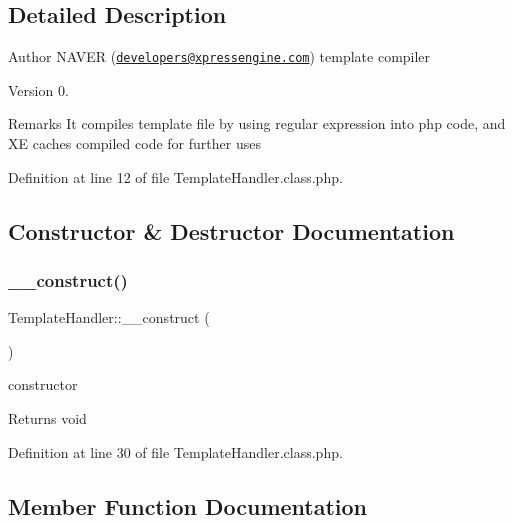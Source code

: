 \subsection{Detailed Description}
\begin{DoxyAuthor}{Author}
N\+A\+V\+ER (\href{mailto:developers@xpressengine.com}{\tt developers@xpressengine.\+com}) template compiler 
\end{DoxyAuthor}
\begin{DoxyVersion}{Version}
0. 
\end{DoxyVersion}
\begin{DoxyRemark}{Remarks}
It compiles template file by using regular expression into php code, and XE caches compiled code for further uses 
\end{DoxyRemark}


Definition at line 12 of file Template\+Handler.\+class.\+php.



\subsection{Constructor \& Destructor Documentation}
\mbox{\label{classTemplateHandler_ab113c65769e65c4fe531c4cf41655f1d}} 
\subsubsection{\texorpdfstring{\+\_\+\+\_\+construct()}{\_\_construct()}}
{\footnotesize\ttfamily Template\+Handler\+::\+\_\+\+\_\+construct (\begin{DoxyParamCaption}{ }\end{DoxyParamCaption})}

constructor \begin{DoxyReturn}{Returns}
void 
\end{DoxyReturn}


Definition at line 30 of file Template\+Handler.\+class.\+php.



\subsection{Member Function Documentation}
\mbox{\label{classTemplateHandler_a6d8e3da7128be8bded89dc9edc4a1bc8}} 
